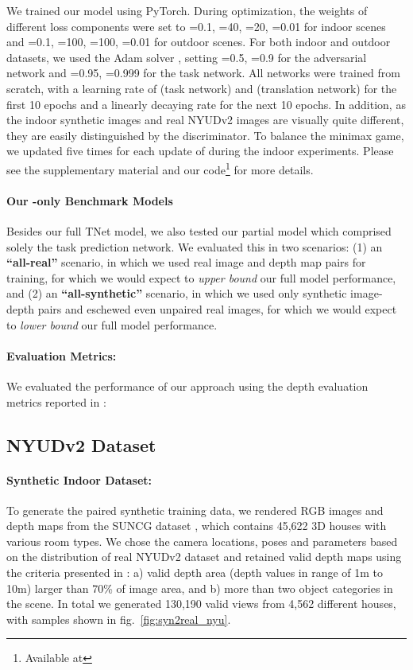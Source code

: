 \documentclass[runningheads]{llncs}
\renewcommand\UrlFont{\color{red}\rmfamily}
\begin{document}
We trained our model using PyTorch. During optimization, the weights of different loss components were set to =0.1, =40, =20, =0.01 for indoor scenes and =0.1, =100, =100, =0.01  for outdoor scenes. For both indoor and outdoor datasets, we used the Adam solver \cite{kingma2014adam}, setting =0.5, =0.9 for the adversarial network and =0.95, =0.999 for the task network. All networks were trained from scratch, with a learning rate of (task network) and  (translation network) for the first 10 epochs and a linearly decaying rate for the next 10 epochs. In addition, as the indoor synthetic images and real NYUDv2 images are visually quite different, they are easily distinguished by the discriminator. To balance the minimax game, we updated  five times for each update of  during the indoor experiments. Please see the supplementary material and our code\footnote{Available at \UrlFont{https://github.com/lyndonzheng/Synthetic2Realistic}} for more details.

\paragraph{\bf Our -only Benchmark Models} Besides our full TNet model, we also tested our partial model which comprised solely the  task prediction network. We evaluated this in two scenarios: (1) an \textbf{``all-real''} scenario, in which we used real image and depth map pairs for training, for which we would expect to \emph{upper bound} our full model performance, and (2) an \textbf{``all-synthetic''} scenario, in which we used only synthetic image-depth pairs and eschewed even unpaired real images, for which we would expect to \emph{lower bound} our full model performance.

\paragraph{\bf Evaluation Metrics:} We evaluated the performance of our approach using the depth evaluation metrics reported in \cite{eigen2014depth}:



\subsection{NYUDv2 Dataset}

\paragraph{\bf Synthetic Indoor Dataset:} To generate the paired synthetic training data, we rendered RGB images and depth maps from the SUNCG dataset \cite{song2017semantic}, which contains 45,622 3D houses with various room types. We chose the camera locations, poses and parameters based on the distribution of real NYUDv2 dataset \cite{silberman2012indoor} and retained valid depth maps using the criteria presented in \cite{song2017semantic}: a) valid depth area (depth values in range of 1m to 10m) larger than 70\% of image area, and b) more than two object categories in the scene. In total we generated 130,190 valid views from 4,562 different houses, with samples shown in fig.~\ref{fig:syn2real_nyu}. 
\end{document}
